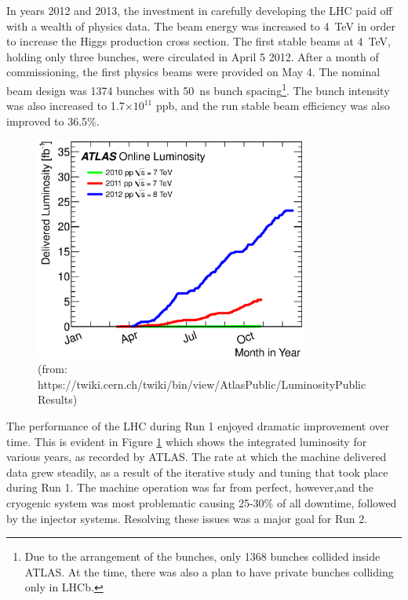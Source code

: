 In years 2012 and 2013, the investment in carefully developing the LHC paid off with a wealth of physics data.
The beam energy was increased to 4~TeV in order to increase the Higgs production cross section.
The first stable beams at 4~TeV, holding only three bunches, were circulated in April 5 2012.
After a month of commissioning, the first physics beams were provided on May 4.
The nominal beam design was 1374 bunches with 50~ns bunch spacing\footnote{Due to the arrangement of the bunches, only 1368 bunches collided inside ATLAS. At the time, there was also a plan to have private bunches colliding only in LHCb.}.
The bunch intensity was also increased to 1.7$\times10^{11}$ ppb, and the run stable beam efficiency was also improved to 36.5\%.

\begin{figure}[h!]
\captionsetup[subfigure]{position=b}
\centering
\includegraphics[width=0.8\textwidth]{figures/experiment/lhc/run1Lumi.eps}
\caption{ (from: https://twiki.cern.ch/twiki/bin/view/AtlasPublic/LuminosityPublicResults)}
\label{fig:run1Lumi}
\end{figure}

The performance of the LHC during Run 1 enjoyed dramatic improvement over time.
This is evident in Figure \ref{fig:run1Lumi} which shows the integrated luminosity for various years, as recorded by ATLAS.
The rate at which the machine delivered data grew steadily, as a result of the iterative study and tuning that took place during Run 1.
The machine operation was far from perfect, however,and the cryogenic system was most problematic causing 25-30\% of all downtime, followed by the injector systems.
Resolving these issues was a major goal for Run 2. \cite{lhcRun1}


